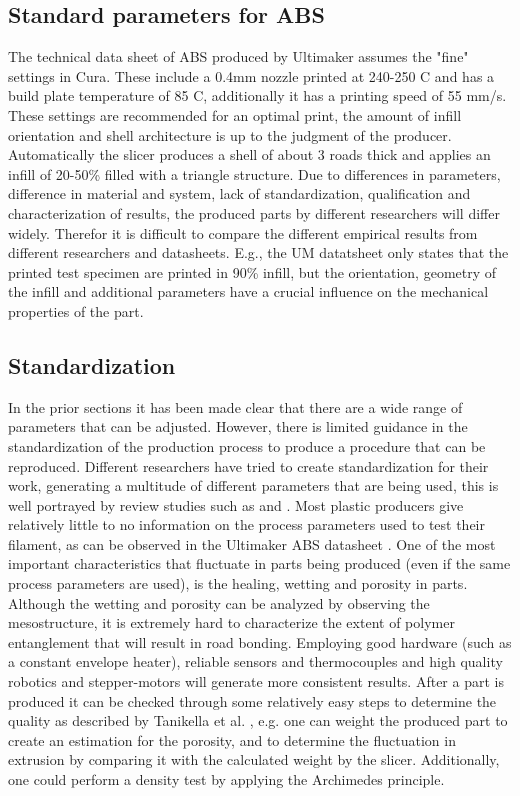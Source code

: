 \subsection{Standard parameters for ABS}
    \label{standard parameters for ABS}
The technical data sheet of ABS produced by Ultimaker \cite{Ultimaker2018TechnicalABS} assumes the "fine" settings in Cura. These include a 0.4mm nozzle printed at 240-250 C and has a build plate temperature of 85 C, additionally it has a printing speed of 55 mm/s. These settings are recommended for an optimal print, the amount of infill orientation and shell architecture is up to the judgment of the producer. Automatically the slicer produces a shell of about 3 roads thick and applies an infill of 20-50\% filled with a triangle structure. Due to differences in parameters, difference in material and system, lack of standardization, qualification and characterization of results, the produced parts by different researchers will differ widely. Therefor it is difficult to compare the different empirical results from different researchers and datasheets. E.g., the UM datatsheet only states that the printed test specimen are printed in 90\% infill, but the orientation, geometry of the infill and additional parameters have a crucial influence on the mechanical properties of the part. 

\subsection{Standardization}
    \label{Standarization}
In the prior sections it has been made clear that there are a wide range of parameters that can be adjusted. However, there is limited guidance in the standardization of the production process to produce a procedure that can be reproduced. Different researchers have tried to create standardization for their work, generating a multitude of different parameters that are being used, this is well portrayed by review studies such as \cite{Peterson2019ReviewPerspective} and \cite{Popescu2018FDMReview}.  Most plastic producers give relatively little to no information on the process parameters used to test their filament, as can be observed in the Ultimaker ABS datasheet \cite{Ultimaker2018TechnicalABS}. One of the most important characteristics that fluctuate in parts being produced (even if the same process parameters are used), is the healing, wetting and porosity in parts. Although the wetting and porosity can be analyzed by observing the mesostructure, it is extremely hard to characterize the extent of polymer entanglement that will result in road bonding. Employing good hardware (such as a constant envelope heater), reliable sensors and thermocouples and high quality robotics and stepper-motors will generate more consistent results. After a part is produced it can be checked through some relatively easy steps to determine the quality as described by Tanikella et al. \cite{Tanikella2017TensilePrinting}, e.g. one can weight the produced part to create an estimation for the porosity, and to determine the fluctuation in extrusion by comparing it with the calculated weight by the slicer. Additionally, one could perform a density test by applying the Archimedes principle.

